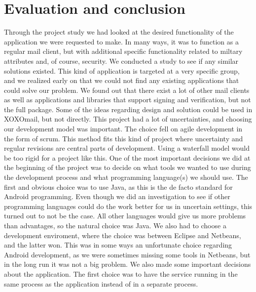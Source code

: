 \pagebreak
\section{Evaluation and conclusion}\label{sec:evalconc}
Through the project study we had looked at the desired functionality of the application we were requested to make. In many ways, it was to function as a regular mail client, but with additional specific functionality related to miltary attributes and, of course, security. We conducted a study to see if any similar solutions existed. This kind of application is targeted at a very specific group, and we realized early on that we could not find any existing applications that could solve our problem. We found out that there exist a lot of other mail clients as well as applications and libraries that support signing and verification, but not the full package. Some of the ideas regarding design and solution could be used in XOXOmail, but not directly.
\newline
\newline
This project had a lot of uncertainties, and choosing our development model was important. The choice fell on agile development in the form of scrum. This method fits this kind of project where uncertainty and regular revisions are central parts of development. Using a waterfall model would be too rigid for a project like this.
\newline
\newline
One of the most important decisions we did at the beginning of the project was to decide on what tools we wanted to use during the development process and what programming language(s) we should use. The first and obvious choice was to use Java, as this is the de facto standard for Android programming. Even though we did an investigation to see if other programming languages could do the work better for us in uncertain settings, this turned out to not be the case. All other languages would give us more problems than advantages, so the natural choice was Java. We also had to choose a development enviroment, where the choice was between Eclipse and Netbeans, and the latter won.  This was in some ways an unfortunate choice regarding Android development, as we were sometimes missing some tools in Netbeans, but in the long run it was not a big problem.
\newline
\newline
We also made some important decisions about the application. The first choice was to have the service running in the same process as the application instead of in a separate process.%
